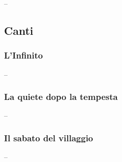 \documentclass{article}
\begin{document}
--

\newpage
\subsection{Canti}
\subsubsection{L'Infinito}

--

\newpage
\subsubsection{La quiete dopo la tempesta}

--

\newpage
\subsubsection{Il sabato del villaggio}

--
\end{document}
